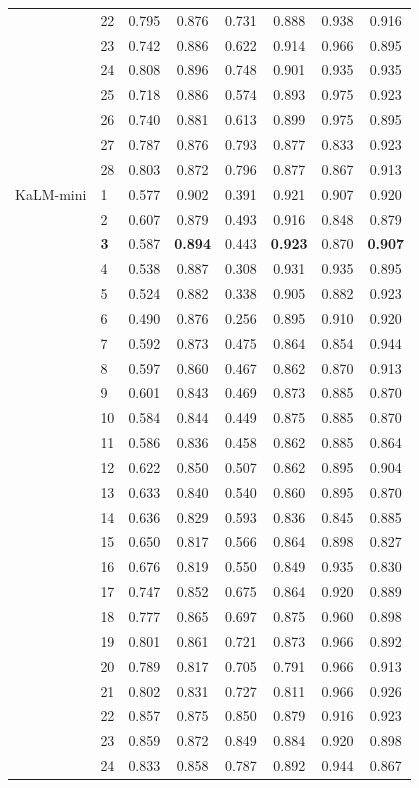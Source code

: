 \begin{longtable}{llcccccc}
 & 22 & 0.795 & 0.876 & 0.731 & 0.888 & 0.938 & 0.916 \\
 & 23 & 0.742 & 0.886 & 0.622 & 0.914 & 0.966 & 0.895 \\
 & 24 & 0.808 & 0.896 & 0.748 & 0.901 & 0.935 & 0.935 \\
 & 25 & 0.718 & 0.886 & 0.574 & 0.893 & 0.975 & 0.923 \\
 & 26 & 0.740 & 0.881 & 0.613 & 0.899 & 0.975 & 0.895 \\
 & 27 & 0.787 & 0.876 & 0.793 & 0.877 & 0.833 & 0.923 \\
 & 28 & 0.803 & 0.872 & 0.796 & 0.877 & 0.867 & 0.913 \\
\midrule
KaLM-mini & 1 & 0.577 & 0.902 & 0.391 & 0.921 & 0.907 & 0.920 \\
 & 2 & 0.607 & 0.879 & 0.493 & 0.916 & 0.848 & 0.879 \\
 & \textbf{3} & 0.587 & \textbf{0.894} & 0.443 & \textbf{0.923} & 0.870 & \textbf{0.907} \\
 & 4 & 0.538 & 0.887 & 0.308 & 0.931 & 0.935 & 0.895 \\
 & 5 & 0.524 & 0.882 & 0.338 & 0.905 & 0.882 & 0.923 \\
 & 6 & 0.490 & 0.876 & 0.256 & 0.895 & 0.910 & 0.920 \\
 & 7 & 0.592 & 0.873 & 0.475 & 0.864 & 0.854 & 0.944 \\
 & 8 & 0.597 & 0.860 & 0.467 & 0.862 & 0.870 & 0.913 \\
 & 9 & 0.601 & 0.843 & 0.469 & 0.873 & 0.885 & 0.870 \\
 & 10 & 0.584 & 0.844 & 0.449 & 0.875 & 0.885 & 0.870 \\
 & 11 & 0.586 & 0.836 & 0.458 & 0.862 & 0.885 & 0.864 \\
 & 12 & 0.622 & 0.850 & 0.507 & 0.862 & 0.895 & 0.904 \\
 & 13 & 0.633 & 0.840 & 0.540 & 0.860 & 0.895 & 0.870 \\
 & 14 & 0.636 & 0.829 & 0.593 & 0.836 & 0.845 & 0.885 \\
 & 15 & 0.650 & 0.817 & 0.566 & 0.864 & 0.898 & 0.827 \\
 & 16 & 0.676 & 0.819 & 0.550 & 0.849 & 0.935 & 0.830 \\
 & 17 & 0.747 & 0.852 & 0.675 & 0.864 & 0.920 & 0.889 \\
 & 18 & 0.777 & 0.865 & 0.697 & 0.875 & 0.960 & 0.898 \\
 & 19 & 0.801 & 0.861 & 0.721 & 0.873 & 0.966 & 0.892 \\
 & 20 & 0.789 & 0.817 & 0.705 & 0.791 & 0.966 & 0.913 \\
 & 21 & 0.802 & 0.831 & 0.727 & 0.811 & 0.966 & 0.926 \\
 & 22 & 0.857 & 0.875 & 0.850 & 0.879 & 0.916 & 0.923 \\
 & 23 & 0.859 & 0.872 & 0.849 & 0.884 & 0.920 & 0.898 \\
 & 24 & 0.833 & 0.858 & 0.787 & 0.892 & 0.944 & 0.867 \\
\end{longtable}
\endgroup
